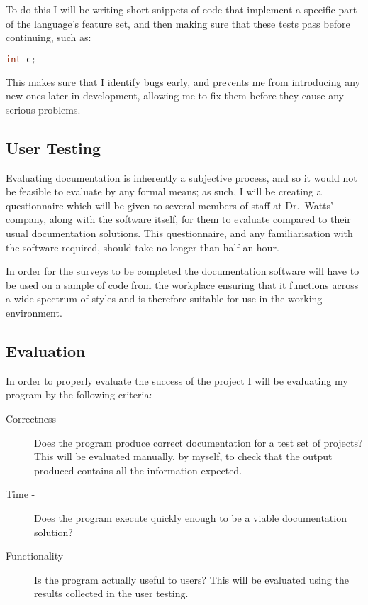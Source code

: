     To do this I will be writing short snippets of code that implement a
    specific part of the language's feature set, and then making sure that these
    tests pass before continuing, such as:

    \begin{lstlisting}[language=c, gobble=4]
      int c;
    \end{lstlisting}

    This makes sure that I identify bugs early, and prevents me from introducing
    any new ones later in development, allowing me to fix them before they cause
    any serious problems.

  \subsection{User Testing}
    Evaluating documentation is inherently a subjective process, and so it would
    not be feasible to evaluate by any formal means; as such, I will be creating
    a questionnaire which will be given to several members of staff at
    Dr.~Watts' company, along with the software itself, for them to evaluate
    compared to their usual documentation solutions. This questionnaire, and any
    familiarisation with the software required, should take no longer than half
    an hour.

    In order for the surveys to be completed the documentation software will
    have to be used on a sample of code from the workplace ensuring that it
    functions across a wide spectrum of styles and is therefore suitable for use
    in the working environment.

  \subsection{Evaluation}
    In order to properly evaluate the success of the project I will be
    evaluating my program by the following criteria:
    \begin{description}
      \item[Correctness -] Does the program produce correct documentation for
        a test set of projects? This will be evaluated manually, by myself, to
        check that the output produced contains all the information expected.
      \item[Time -] Does the program execute quickly enough to be a viable
        documentation solution?
      \item[Functionality -] Is the program actually useful to users? This will
        be evaluated using the results collected in the user testing.
    \end{description}
